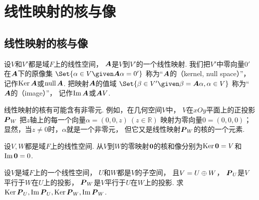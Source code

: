 \section{线性映射的核与像}
\subsection{线性映射的核与像}
\begin{definition}
设\(V\)和\(V'\)都是域\(F\)上的线性空间，
\(\boldsymbol{A}\)是\(V\)到\(V'\)的一个线性映射.
我们把\(V'\)中零向量\(0'\)在\(\boldsymbol{A}\)下的原像集
\(\Set{
	\alpha\in V
	\given
	\vb{A}\alpha=0'
}\)
称为“\(\boldsymbol{A}\)的（kernel, null space）”，
记作\(\operatorname{Ker}\boldsymbol{A}\)或\(\operatorname{null}\boldsymbol{A}\).
把映射\(\boldsymbol{A}\)的值域
\(\Set{
	\beta \in V'
	\given
	\beta = \vb{A}\alpha,
	\alpha \in V
}\)
称为“\(\boldsymbol{A}\)的（image）”，
记作\(\operatorname{Im}\boldsymbol{A}\)或\(\boldsymbol{A}V\).
\end{definition}
\begin{remark}
线性映射的核有可能含有非零元.
例如，在几何空间\(V\)中，
\(V\)在\(xOy\)平面上的正投影\(\boldsymbol{P}_W\)
把\(z\)轴上的每一个向量\(\alpha=(0,0,z)\ (z\in\mathbb{R})\)
映射为零向量\(0=(0,0,0)\)；
显然，当\(z\neq0\)时，\(\alpha\)就是一个非零元，
但它又是线性映射\(\boldsymbol{P}_W\)的核的一个元素.
\end{remark}

\begin{example}
设\(V,W\)都是域\(F\)上的线性空间.
从\(V\)到\(W\)的零映射\(\boldsymbol0\)的核和像分别为\(\operatorname{Ker}\boldsymbol0 = V\)和\(\operatorname{Im}\boldsymbol0 = 0\).
\end{example}

\begin{example}
设\(V\)是域\(F\)上的一个线性空间，
\(U\)和\(W\)都是\(V\)的子空间，
且\(V = U \oplus W\)，
\(\boldsymbol{P}_U\)是\(V\)平行于\(W\)在\(U\)上的投影，
\(\boldsymbol{P}_W\)是\(V\)平行于\(U\)在\(W\)上的投影.
求\(\operatorname{Ker}\boldsymbol{P}_U,
\operatorname{Im}\boldsymbol{P}_U,
\operatorname{Ker}\boldsymbol{P}_W,
\operatorname{Im}\boldsymbol{P}_W\).
\end{example}

